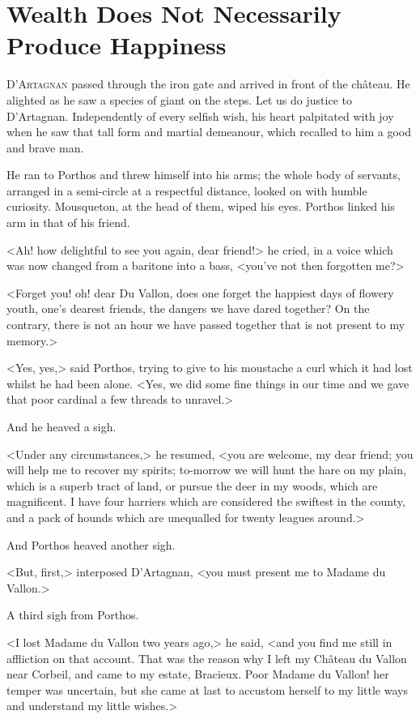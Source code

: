 \chapter{Wealth Does Not Necessarily Produce Happiness}

 \lettrine{D}{'Artagnan} passed through the iron gate and arrived in front of the château. He alighted as he saw a species of giant on the steps. Let us do justice to D'Artagnan. Independently of every selfish wish, his heart palpitated with joy when he saw that tall form and martial demeanour, which recalled to him a good and brave man.

He ran to Porthos and threw himself into his arms; the whole body of servants, arranged in a semi-circle at a respectful distance, looked on with humble curiosity. Mousqueton, at the head of them, wiped his eyes. Porthos linked his arm in that of his friend.

<Ah! how delightful to see you again, dear friend!> he cried, in a voice which was now changed from a baritone into a bass, <you've not then forgotten me?>

<Forget you! oh! dear Du Vallon, does one forget the happiest days of flowery youth, one's dearest friends, the dangers we have dared together? On the contrary, there is not an hour we have passed together that is not present to my memory.>

<Yes, yes,> said Porthos, trying to give to his moustache a curl which it had lost whilst he had been alone. <Yes, we did some fine things in our time and we gave that poor cardinal a few threads to unravel.>

And he heaved a sigh.

<Under any circumstances,> he resumed, <you are welcome, my dear friend; you will help me to recover my spirits; to-morrow we will hunt the hare on my plain, which is a superb tract of land, or pursue the deer in my woods, which are magnificent. I have four harriers which are considered the swiftest in the county, and a pack of hounds which are unequalled for twenty leagues around.>

And Porthos heaved another sigh.

<But, first,> interposed D'Artagnan, <you must present me to Madame du Vallon.>

A third sigh from Porthos.

<I lost Madame du Vallon two years ago,> he said, <and you find me still in affliction on that account. That was the reason why I left my Château du Vallon near Corbeil, and came to my estate, Bracieux. Poor Madame du Vallon! her temper was uncertain, but she came at last to accustom herself to my little ways and understand my little wishes.>

